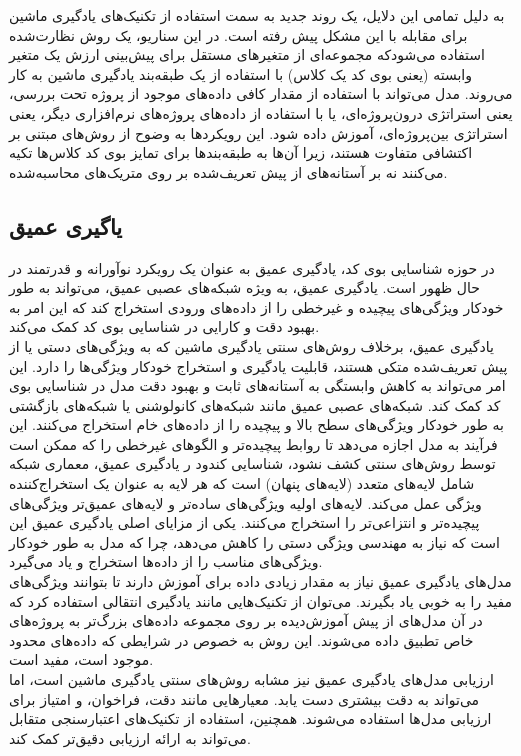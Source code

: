 به دلیل تمامی این دلایل، یک روند جدید به سمت استفاده از تکنیک‌های یادگیری ماشین برای مقابله با این مشکل پیش رفته است. در این سناریو، یک روش نظارت‌شده استفاده می‌شودکه مجموعه‌ای از متغیرهای مستقل برای پیش‌بینی ارزش یک متغیر وابسته (یعنی بوی کد یک کلاس) با استفاده از یک طبقه‌بند یادگیری ماشین به کار می‌روند. مدل می‌تواند با استفاده از مقدار کافی داده‌های موجود از پروژه تحت بررسی، یعنی استراتژی درون‌پروژه‌ای، یا با استفاده از داده‌های پروژه‌های نرم‌افزاری دیگر، یعنی استراتژی بین‌پروژه‌ای، آموزش داده شود. این رویکردها به وضوح از روش‌های مبتنی بر اکتشافی متفاوت هستند، زیرا آن‌ها به طبقه‌بندها برای تمایز بوی کد کلاس‌ها تکیه می‌کنند نه بر آستانه‌های از پیش تعریف‌شده بر روی متریک‌های محاسبه‌شده.\cite{ml}\cite{kaur2017support}

\subsection{یاگیری عمیق}
در حوزه شناسایی بوی کد، یادگیری عمیق به عنوان یک رویکرد نوآورانه و قدرتمند در حال ظهور است. یادگیری عمیق، به ویژه شبکه‌های عصبی عمیق، می‌تواند به طور خودکار ویژگی‌های پیچیده و غیرخطی را از داده‌های ورودی استخراج کند که این امر به بهبود دقت و کارایی در شناسایی بوی کد کمک می‌کند.
\\
یادگیری عمیق، برخلاف روش‌های سنتی یادگیری ماشین که به ویژگی‌های دستی یا از پیش تعریف‌شده متکی هستند، قابلیت یادگیری و استخراج خودکار ویژگی‌ها را دارد. این امر می‌تواند به کاهش وابستگی به آستانه‌های ثابت و بهبود دقت مدل در شناسایی بوی کد کمک کند.
شبکه‌های عصبی عمیق مانند شبکه‌های کانولوشنی یا شبکه‌های بازگشتی به طور خودکار ویژگی‌های سطح بالا و پیچیده را از داده‌های خام استخراج می‌کنند. این فرآیند به مدل اجازه می‌دهد تا روابط پیچیده‌تر و الگوهای غیرخطی را که ممکن است توسط روش‌های سنتی کشف نشود، شناسایی کندود ر یادگیری عمیق، معماری شبکه شامل لایه‌های متعدد (لایه‌های پنهان) است که هر لایه به عنوان یک استخراج‌کننده ویژگی عمل می‌کند. لایه‌های اولیه ویژگی‌های ساده‌تر و لایه‌های عمیق‌تر ویژگی‌های پیچیده‌تر و انتزاعی‌تر را استخراج می‌کنند. یکی از مزایای اصلی یادگیری عمیق این است که نیاز به مهندسی ویژگی دستی را کاهش می‌دهد، چرا که مدل به طور خودکار ویژگی‌های مناسب را از داده‌ها استخراج و یاد می‌گیرد.
\\
مدل‌های یادگیری عمیق نیاز به مقدار زیادی داده برای آموزش دارند تا بتوانند ویژگی‌های مفید را به خوبی یاد بگیرند. می‌توان از تکنیک‌هایی مانند یادگیری انتقالی استفاده کرد که در آن مدل‌های از پیش آموزش‌دیده بر روی مجموعه داده‌های بزرگ‌تر به پروژه‌های خاص تطبیق داده می‌شوند. این روش به خصوص در شرایطی که داده‌های محدود موجود است، مفید است.
\\
ارزیابی مدل‌های یادگیری عمیق نیز مشابه روش‌های سنتی یادگیری ماشین است، اما می‌تواند به دقت بیشتری دست یابد. معیارهایی مانند دقت، فراخوان، و امتیاز  برای ارزیابی مدل‌ها استفاده می‌شوند. همچنین، استفاده از تکنیک‌های اعتبارسنجی متقابل می‌تواند به ارائه ارزیابی دقیق‌تر کمک کند.\cite{liu2019deep}\cite{das2019detecting}

\clearpage
